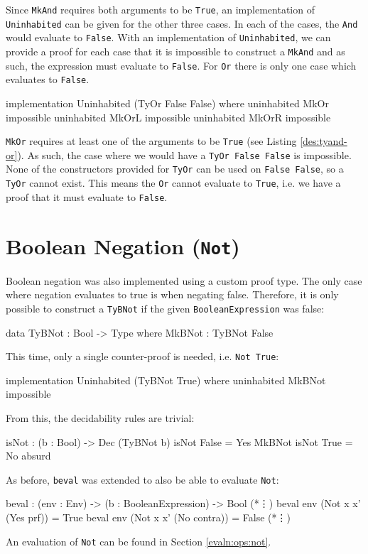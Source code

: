     Since \texttt{MkAnd} requires both arguments to be \texttt{True}, an implementation of \texttt{Uninhabited} can be given for the other three cases. In each of the cases, the \texttt{And} would evaluate to \texttt{False}. With an implementation of \texttt{Uninhabited}, we can provide a proof for each case that it is impossible to construct a \texttt{MkAnd} and as such, the expression must evaluate to \texttt{False}. For \texttt{Or} there is only one case which evaluates to \texttt{False}.
    
    \begin{code}[caption={The impossible \texttt{Or} case}]
        implementation Uninhabited (TyOr False False) where
            uninhabited MkOr  impossible
            uninhabited MkOrL impossible
            uninhabited MkOrR impossible
    \end{code}

    \texttt{MkOr} requires at least one of the arguments to be \texttt{True} (see Listing \ref{des:tyand-or}). As such, the case where we would have a \texttt{TyOr False False} is impossible. None of the constructors provided for \texttt{TyOr} can be used on \texttt{False False}, so a \texttt{TyOr} cannot exist. This means the \texttt{Or} cannot evaluate to \texttt{True}, i.e. we have a proof that it must evaluate to \texttt{False}.

\section{Boolean Negation (\texttt{Not})}
    Boolean negation was also implemented using a custom proof type. The only case where negation evaluates to true is when negating false. Therefore, it is only possible to construct a \texttt{TyBNot} if the given \texttt{BooleanExpression} was false:
    \begin{code}[caption={The proof type for \texttt{Not}}]
        data TyBNot : Bool -> Type where
            MkBNot  : TyBNot False
    \end{code}
    This time, only a single counter-proof is needed, i.e. \texttt{Not True}:
    \begin{code}[caption={Constructing \texttt{Not True} is impossible}]
        implementation Uninhabited (TyBNot True) where
            uninhabited MkBNot impossible
    \end{code}
    From this, the decidability rules are trivial:
    \begin{code}[caption={Decidability rules for \texttt{Not}}]
        isNot : (b : Bool) -> Dec (TyBNot b)
        isNot False = Yes MkBNot
        isNot True  = No absurd
    \end{code}
    As before, \texttt{beval} was extended to also be able to evaluate \texttt{Not}:
    \begin{code}[caption={\texttt{beval} for \texttt{Not}}, escapeinside={(*}{*)}]
        beval : (env : Env) -> (b : BooleanExpression) -> Bool
            (*\vdots*)
        beval env (Not x x' (Yes prf))   = True
        beval env (Not x x' (No contra)) = False
            (*\vdots*)
    \end{code}
    
    An evaluation of \texttt{Not} can be found in Section \ref{evaln:ops:not}.
    
    
